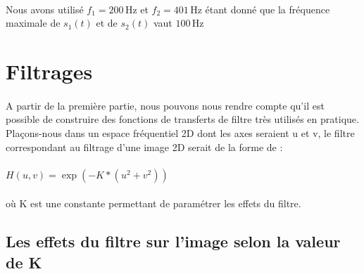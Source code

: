 \documentclass{article}
\begin{document}
\paragraph{}
Nous avons utilisé $f_1=200\,\mathrm{Hz}$ et $f_2=401\,\mathrm{Hz}$ étant donné que la fréquence maximale de $s_1(t)$ et de $s_2(t)$ vaut $100\,\mathrm{Hz}$

\section{Filtrages}
\paragraph{}
\justifying
A partir de la première partie, nous pouvons nous rendre compte qu'il est possible de construire des fonctions de transferts de filtre très utilisés en pratique. Plaçons-nous dans un espace fréquentiel 2D dont les axes seraient u et v, le filtre correspondant au filtrage d'une image 2D serait de la forme de :

\paragraph{}
\centering $H(u,v) = \exp(-K*(u^2+v^2))$
\paragraph{}
où K est une constante permettant de paramétrer les effets du filtre.

\subsection {Les effets du filtre sur l'image selon la valeur de K}
\end{document}
